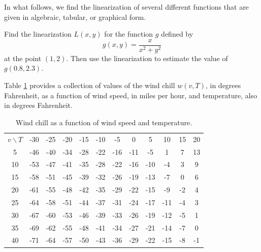 \begin{activity} \label{A:10.4.11} In what follows, we find the linearization of several different functions that are given in algebraic, tabular, or graphical form.
\ba

\item Find the linearization $L(x,y)$ for the function $g$ defined by 
$$
g(x,y) = \frac{x}{x^2+y^2}
$$
at the point $(1,2)$.  Then use the linearization to estimate the value of
 $g(0.8, 2.3)$.

\item Table \ref{T:10.4.wind.chill} provides a collection of
  values of the wind chill $w(v,T)$, in degrees Fahrenheit, as a
  function of  wind speed, in miles per hour, and temperature, also in degrees Fahrenheit.
 

\begin{table}[ht] 
  \begin{center}
    \begin{tabular}{|c||c|c|c|c|c|c|c|c|c|c|c|}
      \hline
      $v \backslash T$  
         &-30  &-25 &-20 &-15 &-10 &-5  &0   &5   &10  &15  &20  \\
      \hhline{|=|=|=|=|=|=|=|=|=|=|=|=|}
      5  &-46	&-40 &-34 &-28 &-22 &-16 &-11 &-5 &1 &7 &13  \\
      \hline
      10 &-53	&-47 &-41 &-35 &-28 &-22 &-16 &-10 &-4 &3 &9   \\
      \hline
      15 &-58	&-51 &-45 &-39 &-32 &-26 &-19 &-13 &-7 &0 &6  \\
      \hline
      20 &-61	&-55 &-48 &-42 &-35 &-29 &-22 &-15 &-9 &-2 &4  \\
      \hline
      25 &-64	&-58 &-51 &-44 &-37 &-31 &-24 &-17 &-11 &-4 &3 \\
      \hline
      30 &-67	&-60 &-53 &-46 &-39 &-33 &-26 &-19 &-12 &-5 &1 \\
      \hline
      35 &-69	&-62 &-55 &-48 &-41 &-34 &-27 &-21 &-14 &-7 &0 \\
      \hline
      40 &-71	&-64 &-57 &-50 &-43 &-36 &-29 &-22 &-15 &-8 &-1 \\
      \hline
    \end{tabular}
    \caption{Wind chill as a function of wind speed and temperature.}
    \label{T:10.4.wind.chill}
  \end{center}
\end{table}

\end{activity}
